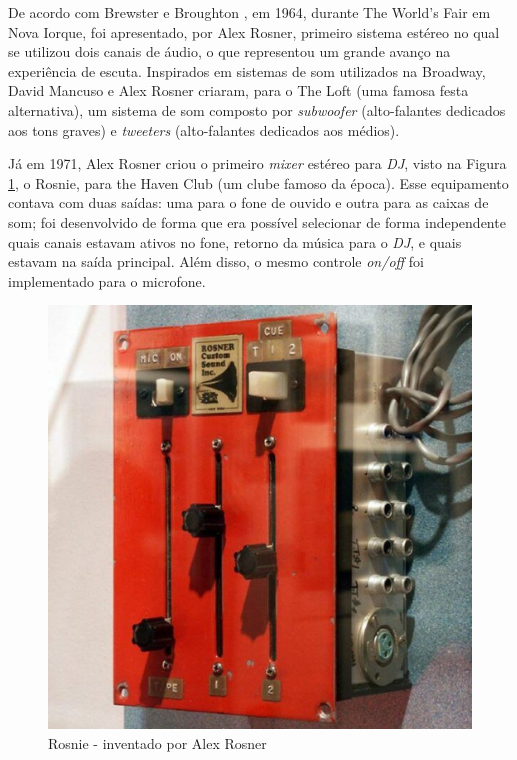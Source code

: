 \par
De acordo com  Brewster e Broughton \cite{lastnight}, em 1964, durante The World's Fair em Nova Iorque, foi apresentado, por Alex Rosner, primeiro sistema estéreo no qual se utilizou dois canais de áudio, o que representou um grande avanço na experiência de escuta. Inspirados em sistemas de som utilizados na Broadway, David Mancuso e Alex Rosner criaram, para o The Loft (uma famosa festa alternativa), um sistema de som composto por \textit{subwoofer} (alto-falantes dedicados aos tons graves) e \textit{tweeters} (alto-falantes dedicados aos médios).
\par
Já em 1971, Alex Rosner criou o primeiro \textit{mixer} estéreo para \textit{DJ}, visto na Figura \ref{fig08}, o Rosnie, para the Haven Club (um clube famoso da época). Esse equipamento contava com duas saídas: uma para o fone de ouvido e outra para as caixas de som; foi desenvolvido de forma que era possível selecionar de forma independente quais canais estavam ativos no fone, retorno da música para o \textit{DJ}, e quais estavam na saída principal. Além disso, o mesmo controle \textit{on/off} foi implementado para o microfone. 
\begin{figure}[h]
	\centering
    \includegraphics[scale=0.4]{figuras/fig08.eps}
	\caption{Rosnie - inventado por Alex Rosner \cite{stoneyroadsStoryBehind}}
	\label{fig08}
\end{figure}
